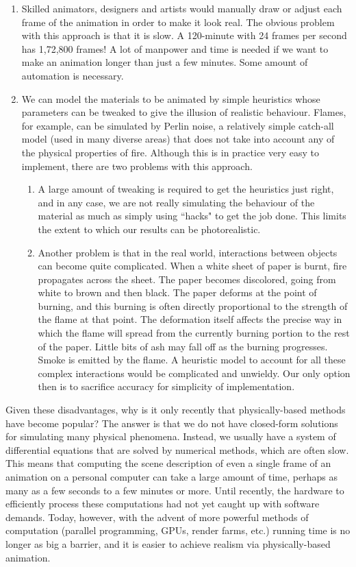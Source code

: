 \documentclass[12pt]{report}
\begin{document}
\begin{enumerate}
  \item Skilled animators, designers and artists would manually draw or adjust each frame of the animation in order to make it look real. The obvious problem with this approach is that it is slow. A 120-minute with 24 frames per second has 1,72,800 frames! A lot of manpower and time is needed if we want to make an animation longer than just a few minutes. Some amount of automation is necessary.
  \item We can model the materials to be animated by simple heuristics whose parameters can be tweaked to give the illusion of realistic behaviour. Flames, for example, can be simulated by Perlin noise, a relatively simple catch-all model (used in many diverse areas) that does not take into account any of the physical properties of fire. Although this is in practice very easy to implement, there are two problems with this approach.
  \begin{enumerate}
    \item A large amount of tweaking is required to get the heuristics just right, and in any case, we are not really simulating the behaviour of the material as much as simply using ``hacks" to get the job done. This limits the extent to which our results can be photorealistic.
    \item Another problem is that in the real world, interactions between objects can become quite complicated. When a white sheet of paper is burnt, fire propagates across the sheet. The paper becomes discolored, going from white to brown and then black. The paper deforms at the point of burning, and this burning is often directly proportional to the strength of the flame at that point. The deformation itself affects the precise way in which the flame will spread from the currently burning portion to the rest of the paper. Little bits of ash may fall off as the burning progresses. Smoke is emitted by the flame. A heuristic model to account for all these complex interactions would be complicated and unwieldy. Our only option then is to sacrifice accuracy for simplicity of implementation.
  \end{enumerate}
\end{enumerate}

Given these disadvantages, why is it only recently that physically-based methods have become popular? The answer is that we do not have closed-form solutions for simulating many physical phenomena. Instead, we usually have a system of differential equations that are solved by numerical methods, which are often slow. This means that computing the scene description of even a single frame of an animation on a personal computer can take a large amount of time, perhaps as many as a few seconds to a few minutes or more. Until recently, the hardware to efficiently process these computations had not yet caught up with software demands. Today, however, with the advent of more powerful methods of computation (parallel programming, GPUs, render farms, etc.) running time is no longer as big a barrier, and it is easier to achieve realism via physically-based animation.
\end{document}
